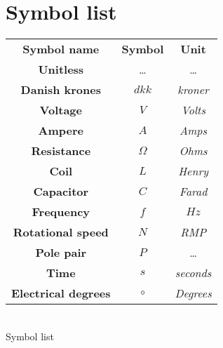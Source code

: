 \section{Symbol list}
\label{sec:symbol_list}

\begin{center}
\begin{tabular}{|c|c|c|} \cline{1-3}
\textbf{Symbol name} & \textbf{Symbol} & \textbf{Unit} \\ \cline{1-3}
\textbf{Unitless} & \dots & \dots \\ \cline{1-3}
\textbf{Danish krones} & $dkk$ & \textit{kroner} \\ \cline{1-3}
\textbf{Voltage} & $V$ & \textit{Volts} \\ \cline{1-3}
\textbf{Ampere} & $A$ & \textit{Amps} \\ \cline{1-3}
\textbf{Resistance} & $\Omega$ & \textit{Ohms} \\ \cline{1-3}
\textbf{Coil} & $L$ & \textit{Henry} \\ \cline{1-3}
\textbf{Capacitor} & $C$ & \textit{Farad} \\ \cline{1-3}
\textbf{Frequency} & $f$ & $Hz$\\ \cline{1-3} 
\textbf{Rotational speed} & $N$ & \textit{RMP}\\ \cline{1-3}
\textbf{Pole pair} & $P$ & \dots \\ \cline{1-3}
\textbf{Time} & $s$ & \textit{seconds} \\ \cline{1-3}
\textbf{Electrical degrees} & $\circ$ & \textit{Degrees} \\ \cline{1-3}
\end{tabular} \\
\caption{Symbol list}\label{Symbollist}
\label{tab:variable_ids}
\end{center}
